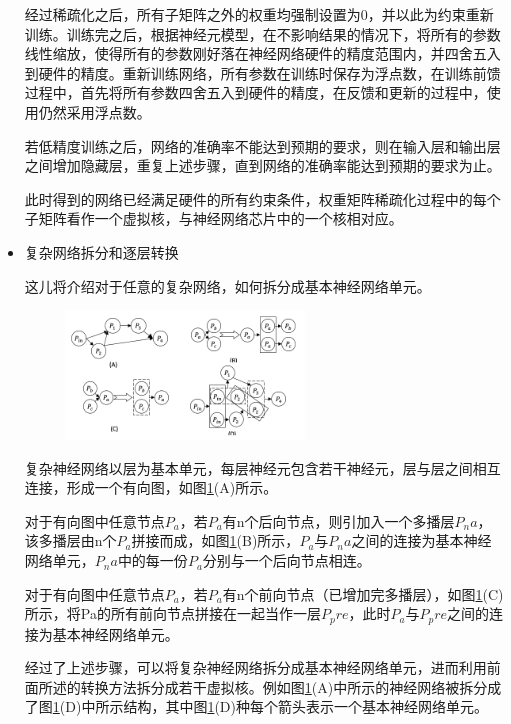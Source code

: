 \begin{itemize}
    经过稀疏化之后，所有子矩阵之外的权重均强制设置为0，并以此为约束重新训练。训练完之后，根据神经元模型，在不影响结果的情况下，将所有的参数线性缩放，使得所有的参数刚好落在神经网络硬件的精度范围内，并四舍五入到硬件的精度。重新训练网络，所有参数在训练时保存为浮点数，在训练前馈过程中，首先将所有参数四舍五入到硬件的精度，在反馈和更新的过程中，使用仍然采用浮点数。
    
    若低精度训练之后，网络的准确率不能达到预期的要求，则在输入层和输出层之间增加隐藏层，重复上述步骤，直到网络的准确率能达到预期的要求为止。
    
    此时得到的网络已经满足硬件的所有约束条件，权重矩阵稀疏化过程中的每个子矩阵看作一个虚拟核，与神经网络芯片中的一个核相对应。
    
    \item 复杂网络拆分和逐层转换
    
    这儿将介绍对于任意的复杂网络，如何拆分成基本神经网络单元。 
    
    \begin{figure}[!htbp]
    \centering
    \includegraphics[width=0.60\textwidth]{Img/Chap_Application/Zhang/MNsplit.png}
    \label{fig:MNsplit}
    \end{figure}
    
    复杂神经网络以层为基本单元，每层神经元包含若干神经元，层与层之间相互连接，形成一个有向图，如图\ref{fig:MNsplit}(A)所示。

    对于有向图中任意节点$P_a$，若$P_a$有n个后向节点，则引加入一个多播层$P_na$，该多播层由n个$P_a$拼接而成，如图\ref{fig:MNsplit}(B)所示，$P_a$与$P_na$之间的连接为基本神经网络单元，$P_na$中的每一份$P_a$分别与一个后向节点相连。
    
    对于有向图中任意节点$P_a$，若$P_a$有n个前向节点（已增加完多播层），如图\ref{fig:MNsplit}(C)所示，将Pa的所有前向节点拼接在一起当作一层$P_pre$，此时$P_a$与$P_pre$之间的连接为基本神经网络单元。
    
    经过了上述步骤，可以将复杂神经网络拆分成基本神经网络单元，进而利用前面所述的转换方法拆分成若干虚拟核。例如图\ref{fig:MNsplit}(A)中所示的神经网络被拆分成了图\ref{fig:MNsplit}(D)中所示结构，其中图\ref{fig:MNsplit}(D)种每个箭头表示一个基本神经网络单元。
    

\end{itemize}
